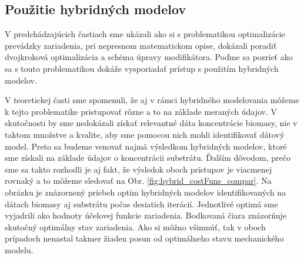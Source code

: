 \subsection{Použitie hybridných modelov}
V predchádzajúcich častiach sme ukázali ako si s problematikou optimalizácie prevádzky zariadenia, pri nepresnom matematickom opise, dokázali poradiť dvojkroková optimalizácia a schéma úpravy modifikátora. Poďme sa pozrieť ako sa s touto problematikou dokáže vysporiadať prístup s použitím hybridných modelov.

V teoretickej časti sme spomenuli, že aj v rámci hybridného modelovania môžeme k tejto problematike pristupovať rôzne a to na základe meraných údajov. V skutočnosti by sme nedokázali získať relevantné dáta koncentrácie biomasy, nie v taktom množstve a kvalite, aby sme pomocou nich mohli identifikovať dátový model. Preto sa budeme venovať najmä výsledkom hybridných modelov, ktoré sme získali na základe údajov o koncentrácii substrátu. Ďalším dôvodom, prečo sme sa takto rozhodli je aj fakt, že výsledok oboch prístupov je viacmenej rovnaký a to môžeme sledovať na Obr. \ref{fig:hybrid_costFuns_compar}. Na obrázku je znázornený priebeh optím hybridných modelov identifikovaných na dátach biomasy aj substrátu počas desiatich iterácií. Jednotlivé optimá sme vyjadrili ako hodnoty účelovej funkcie zariadenia. Bodkovaná čiara znázorňuje skutočný optimálny stav zariadenia. Ako si môžno všimnúť, tak v oboch prípadoch nenastal takmer žiaden posun od optimálneho stavu mechanického modelu. 
